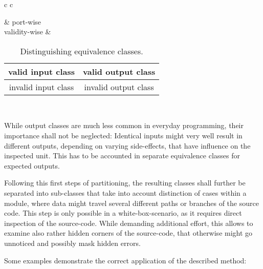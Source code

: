 	\begin{table}[h!]
	\begin{center}
		\begin{tabular}{c c}
		
						& port-wise  \\
		validity-wise	& \begin{tabular}{|c | c|} \hline
						valid input class 	& valid output class   \\  \hline
						invalid input class 	& invalid output class \\ \hline
							\end{tabular}		\\ %
		\end{tabular}
			\caption{Distinguishing equivalence classes.}
			\label{EquiClasses}
	\end{center}
	\end{table}
	While output classes are much less common in everyday programming, their importance shall not be neglected: Identical inputs might very well result in different outputs, depending on varying side-effects, that have influence on the inspected unit. This has to be accounted in separate equivalence classes for expected outputs.
	
	Following this first steps of partitioning, the resulting classes shall further be separated into sub-classes that take into account distinction of cases within a module, where data might travel several different paths or branches of the source code. This step is only possible in a white-box-scenario, as it requires direct inspection of the source-code. While demanding additional effort, this allows to examine also rather hidden corners of the source-code, that otherwise might go unnoticed and possibly mask hidden errors.

	Some examples demonstrate the correct application of the described method:
	

